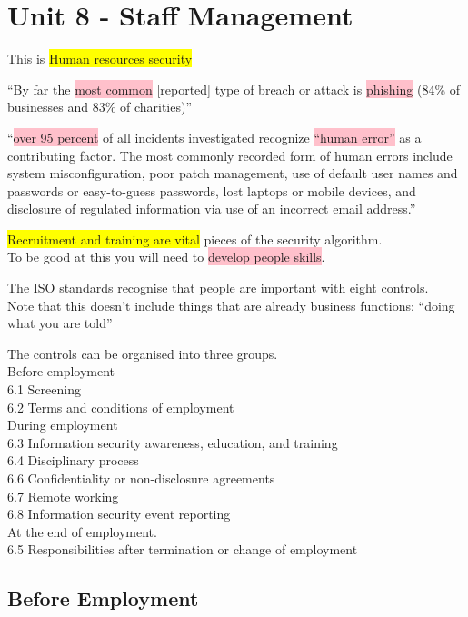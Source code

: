 \documentclass[tikz,border=10pt]{project_plan}
\begin{document}
\chapter{Unit 8 - Staff Management}

This is \colorbox{yellow}{Human resources security}

“By far the \colorbox{pink}{most common} [reported] type of breach or attack is \colorbox{pink}{phishing} (84\% of businesses and 83\% of charities)”

“\colorbox{pink}{over 95 percent} of all incidents investigated recognize \colorbox{pink}{“human error”} as a contributing factor. The most
commonly recorded form of human errors include system misconfiguration, poor patch management, use of
default user names and passwords or easy-to-guess passwords, lost laptops or mobile devices, and
disclosure of regulated information via use of an incorrect email address.”

\colorbox{yellow}{Recruitment and training are vital} pieces of the security algorithm.\\
To be good at this you will need to \colorbox{pink}{develop people skills}.

The ISO standards recognise that people are important with eight controls.  \\
Note that this doesn’t include things that are already business functions: “doing what you are told”

The controls can be organised into three groups.\\
\hphantom{12}Before employment\\
\hphantom{1234}6.1 Screening\\
\hphantom{1234}6.2 Terms and conditions of employment\\
\hphantom{12}During employment\\
\hphantom{1234}6.3 Information security awareness, education, and training\\
\hphantom{1234}6.4 Disciplinary process\\
\hphantom{1234}6.6 Confidentiality or non-disclosure agreements\\
\hphantom{1234}6.7 Remote working\\
\hphantom{1234}6.8 Information security event reporting\\
\hphantom{12}At the end of employment. \\
\hphantom{1234}6.5 Responsibilities after termination or change of employment

\section{Before Employment}
\end{document}
